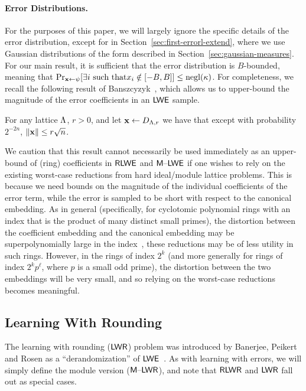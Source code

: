 \paragraph{Error Distributions.} For the purposes of this paper, we will
largely ignore the specific details of the error distribution, except for in
Section~\ref{sec:first-errorl-extend}, where we use Gaussian distributions of the form
described in Section~\ref{sec:gaussian-measures}.
For our main result, it is sufficient that the error distribution
is $B$-bounded, meaning that 
$\Pr_{\mathbf{x} \gets \psi}[\exists i\text{ such that}  x_i \notin [-B,B]] \leq \operatorname{negl}(\kappa)$.
\iflncs
\else
For completeness, we recall the following result of
Banszcyzyk~\cite{banaszczyk93:_new}, which allows us to upper-bound
the magnitude of the error coefficients in an $\mathsf{LWE}$ sample.

\begin{lemma} \label{lem:ban}
  For any lattice $\Lambda$, $r>0$, and let $\mathbf{x} \gets D_{\Lambda,r}$ we
  have that except with probability $2^{-2n}$,
  $\lVert\mathbf{x}\rVert \leq r\sqrt{n}$.
\end{lemma}

We caution that this result
cannot necessarily be used immediately as an upper-bound of (ring)
coefficients in $\mathsf{RLWE}$ and $\mathsf{M \text{\textendash} LWE}$  if one wishes to rely on
the existing worst-case reductions from hard ideal/module lattice problems. This is because we need bounds on the
magnitude of the individual coefficients of the error term, while the
error is sampled to be short with respect to the canonical
embedding. As in general (specifically, for cyclotomic polynomial rings
with an index that is the product of many distinct small
primes), the distortion between the coefficient embedding and the
canonical embedding may be superpolynomially
large in the index~\cite{erdos46:_coeff_of_cyclot_polyn}, these reductions may be
of less utility in such rings. However, in the rings of index $2^{k}$
(and more generally for rings of index $2^kp^{\ell}$, where $p$ is a
small odd prime), 
the distortion between the two embeddings will be very small, and so
relying on the worst-case reductions becomes meaningful. 
\fi
\subsection{Learning With Rounding}
\label{sec:learn-with-round}
The learning with rounding ($\mathsf{LWR}$) problem was introduced by
Banerjee, Peikert and Rosen as a ``derandomization'' of
$\mathsf{LWE}$~\cite{DBLP:conf/eurocrypt/BanerjeePR12}. 
As with learning with errors, we will simply define the module version
($\mathsf{M \text{\textendash} LWR}$), and note that $\mathsf{RLWR}$ and $\mathsf{LWR}$ fall out as special
cases. 

